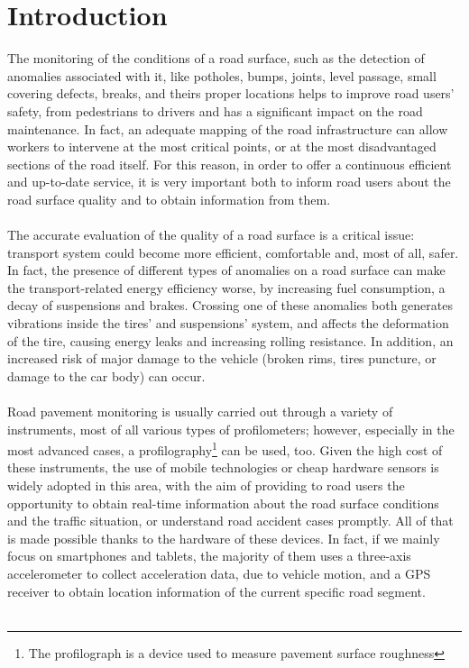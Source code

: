 \documentclass[tesi]{subfiles}
\begin{document}
\chapter{Introduction}
\label{ch:Introduction}

The monitoring of the conditions of a road surface, such as the detection of anomalies associated with it, like potholes, bumps, joints, level passage, small covering defects, breaks, and theirs proper locations helps to improve road users' safety, from pedestrians to drivers and has a significant impact on the road maintenance. In fact, an adequate mapping of the road infrastructure can allow workers to intervene at the most critical points, or at the most disadvantaged sections of the road itself. For this reason, in order to offer a continuous efficient and up-to-date service, it is very important both to inform road users about the road surface quality and to obtain information from them.\\\\
The accurate evaluation of the quality of a road surface is a critical issue: transport system could become more efficient, comfortable and, most of all, safer. In fact, the presence of different types of anomalies on a road surface can make the transport-related energy efficiency worse, by increasing fuel consumption, a decay of suspensions and brakes. Crossing one of these anomalies both generates vibrations inside the tires' and suspensions' system, and affects the deformation of the tire, causing energy leaks and increasing rolling resistance. In addition, an increased risk of major damage to the vehicle (broken rims, tires puncture, or damage to the car body) can occur.\\\\
\noindent Road pavement monitoring is usually carried out through a variety of instruments, most of all various types of profilometers; however, especially in the most advanced cases, a profilography\footnote{The profilograph is a device used to measure pavement surface roughness} can be used, too.
Given the high cost of these instruments, the use of mobile technologies or cheap hardware sensors is widely adopted in this area, with the aim of providing to road users the opportunity to obtain real-time information about the road surface conditions and the traffic situation, or understand road accident cases promptly. All of that is made possible thanks to the hardware of these devices. In fact, if we mainly focus on smartphones and tablets, the majority of them uses a three-axis accelerometer to collect acceleration data, due to vehicle motion, and a GPS receiver to obtain location information of the current specific road segment.\\\\
\end{document}
